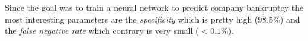 Since the goal was to train a neural network to predict company bankruptcy the most interesting parameters are the \emph{specificity} which is pretty high (98.5\%) and the \emph{false negative rate} which contrary is very small ($< 0.1\%$).

%
%
%
%
%
%
%
%
%
%
%
%
